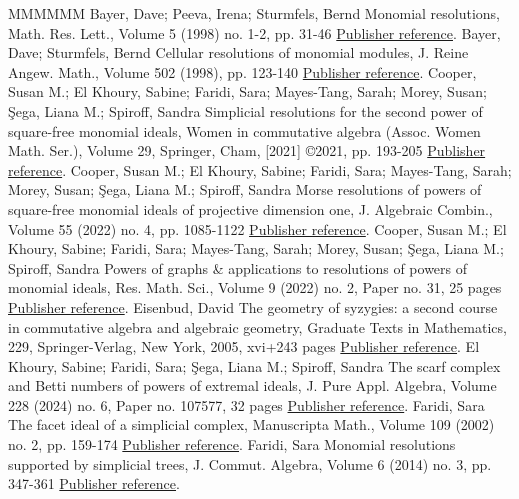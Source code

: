 \begin{thebibliography}{MMMMMM}
 Bayer, Dave; Peeva, Irena; Sturmfels, Bernd Monomial resolutions, Math. Res. Lett., Volume 5 (1998) no. 1-2, pp. 31-46 \href{https://alco.centre-mersenne.org/articles/10.5802/alco.325/#BPS}{Publisher reference}.
 Bayer, Dave; Sturmfels, Bernd Cellular resolutions of monomial modules, J. Reine Angew. Math., Volume 502 (1998), pp. 123-140 \href{https://alco.centre-mersenne.org/articles/10.5802/alco.325/#BS}{Publisher reference}.
 Cooper, Susan M.; El Khoury, Sabine; Faridi, Sara; Mayes-Tang, Sarah; Morey, Susan; Şega, Liana M.; Spiroff, Sandra Simplicial resolutions for the second power of square-free monomial ideals, Women in commutative algebra (Assoc. Women Math. Ser.), Volume 29, Springer, Cham, [2021] ©2021, pp. 193-205 \href{https://alco.centre-mersenne.org/articles/10.5802/alco.325/#L2}{Publisher reference}.
 Cooper, Susan M.; El Khoury, Sabine; Faridi, Sara; Mayes-Tang, Sarah; Morey, Susan; Şega, Liana M.; Spiroff, Sandra Morse resolutions of powers of square-free monomial ideals of projective dimension one, J. Algebraic Combin., Volume 55 (2022) no. 4, pp. 1085-1122 \href{https://alco.centre-mersenne.org/articles/10.5802/alco.325/#morse}{Publisher reference}.
 Cooper, Susan M.; El Khoury, Sabine; Faridi, Sara; Mayes-Tang, Sarah; Morey, Susan; Şega, Liana M.; Spiroff, Sandra Powers of graphs \& applications to resolutions of powers of monomial ideals, Res. Math. Sci., Volume 9 (2022) no. 2, Paper no. 31, 25 pages \href{https://alco.centre-mersenne.org/articles/10.5802/alco.325/#koszul}{Publisher reference}.
 Eisenbud, David The geometry of syzygies: a second course in commutative algebra and algebraic geometry, Graduate Texts in Mathematics, 229, Springer-Verlag, New York, 2005, xvi+243 pages \href{https://alco.centre-mersenne.org/articles/10.5802/alco.325/#E}{Publisher reference}.
 El Khoury, Sabine; Faridi, Sara; Şega, Liana M.; Spiroff, Sandra The scarf complex and Betti numbers of powers of extremal ideals, J. Pure Appl. Algebra, Volume 228 (2024) no. 6, Paper no. 107577, 32 pages \href{https://alco.centre-mersenne.org/articles/10.5802/alco.325/#MFO}{Publisher reference}.
 Faridi, Sara The facet ideal of a simplicial complex, Manuscripta Math., Volume 109 (2002) no. 2, pp. 159-174 \href{https://alco.centre-mersenne.org/articles/10.5802/alco.325/#F02}{Publisher reference}.
 Faridi, Sara Monomial resolutions supported by simplicial trees, J. Commut. Algebra, Volume 6 (2014) no. 3, pp. 347-361 \href{https://alco.centre-mersenne.org/articles/10.5802/alco.325/#F14}{Publisher reference}.

\end{thebibliography}
